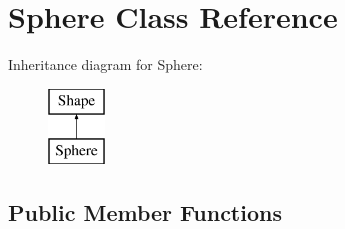 \hypertarget{class_sphere}{}\section{Sphere Class Reference}
\label{class_sphere}
Inheritance diagram for Sphere\+:\begin{figure}[H]
\begin{center}
\leavevmode
\includegraphics[height=2.000000cm]{class_sphere}
\end{center}
\end{figure}
\subsection*{Public Member Functions}
